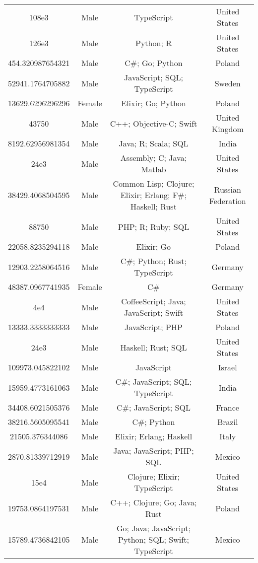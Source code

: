 \begin{center}
\begin{tabular}{ |c|c|c|c| }
108e3  &  Male  &  TypeScript  &  United States  \\ 
126e3  &  Male  &  Python; R  &  United States  \\ 
454.320987654321  &  Male  &  C\#; Go; Python  &  Poland  \\ 
52941.1764705882  &  Male  &  JavaScript; SQL; TypeScript  &  Sweden  \\ 
13629.6296296296  &  Female  &  Elixir; Go; Python  &  Poland  \\ 
43750  &  Male  &  C++; Objective-C; Swift  &  United Kingdom  \\ 
8192.62956981354  &  Male  &  Java; R; Scala; SQL  &  India  \\ 
24e3  &  Male  &  Assembly; C; Java; Matlab  &  United States  \\ 
38429.4068504595  &  Male  &  Common Lisp; Clojure; Elixir; Erlang; F\#; Haskell; Rust  &  Russian Federation  \\ 
88750  &  Male  &  PHP; R; Ruby; SQL  &  United States  \\ 
22058.8235294118  &  Male  &  Elixir; Go  &  Poland  \\ 
12903.2258064516  &  Male  &  C\#; Python; Rust; TypeScript  &  Germany  \\ 
48387.0967741935  &  Female  &  C\#  &  Germany  \\ 
4e4  &  Male  &  CoffeeScript; Java; JavaScript; Swift  &  United States  \\ 
13333.3333333333  &  Male  &  JavaScript; PHP  &  Poland  \\ 
24e3  &  Male  &  Haskell; Rust; SQL  &  United States  \\ 
109973.045822102  &  Male  &  JavaScript  &  Israel  \\ 
15959.4773161063  &  Male  &  C\#; JavaScript; SQL; TypeScript  &  India  \\ 
34408.6021505376  &  Male  &  C\#; JavaScript; SQL  &  France  \\ 
38216.5605095541  &  Male  &  C\#; Python  &  Brazil  \\ 
21505.376344086  &  Male  &  Elixir; Erlang; Haskell  &  Italy  \\ 
2870.81339712919  &  Male  &  Java; JavaScript; PHP; SQL  &  Mexico  \\ 
15e4  &  Male  &  Clojure; Elixir; TypeScript  &  United States  \\ 
19753.0864197531  &  Male  &  C++; Clojure; Go; Java; Rust  &  Poland  \\ 
15789.4736842105  &  Male  &  Go; Java; JavaScript; Python; SQL; Swift; TypeScript  &  Mexico  \\ 

\end{tabular}
\end{center}
